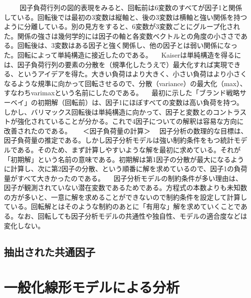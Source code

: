 \documentclass[a4j,11pt,mc]{jreport}
\begin{document}
	　
	　因子負荷行列の図的表現をみると、回転前は6変数のすべてが因子1と関係している。回転後では最初の3変数は縦軸と、後の3変数は横軸と強い関係を持つように分離している。別の見方をすると、6変数が3変数ごとにグループ化された。関係の強さは幾何学的には因子の軸と各変数ベクトルとの角度の小ささである。回転後は、3変数はある因子と強く関係し、他の因子とは弱い関係になった。回転によって単純構造に接近したのである。
	　Kaiserは単純構造を得るには、因子負荷行列の要素の分散を（規準化したうえで）最大化すれば実現できる、というアイデアを得た。大きい負荷はより大きく、小さい負荷はより小さくなるような規準に向かって回転させるので、分散（variance）の最大化（max）、すなわちvarimaxという名前にしたのである。
	　最初に示した「ブランド戦略サーベイ」の初期解（回転前）は、因子1にほぼすべての変数は高い負荷を持つ。しかし、バリマックス回転後は単純構造に向かって、因子と変数とのコントラストが強化されていることが分かる。これで4因子についての解釈は容易な方向に改善されたのである。
	 　
	＜因子負荷量の計算＞
	　因子分析の数理的な目標は、因子負荷量の推定である。しかし因子分析モデルは強い制約条件をもつ統計モデルである。そのため、まず計算しやすいような解を最初に求めている。それが「初期解」という名前の意味である。初期解は第1因子の分散が最大になるように計算し、次に第2因子の分散、という順番に解を求めているので、因子1の負荷量がすべて大きかったのである。
	　因子分析モデルの制約条件が多い理由は、因子が観測されていない潜在変数であるためである。方程式の本数よりも未知数の方が多いと、一意に解を求めることができないので制約条件を設定して計算している。回転解とはそのような制約のあとに「有用な」解を求めていくことである。なお、回転しても因子分析モデルの共通性や独自性、モデルの適合度などは変化しない。


\section{抽出された共通因子}


%
%
%
%
%
%
%








\chapter{一般化線形モデルによる分析}\label{glm}
\end{document}
